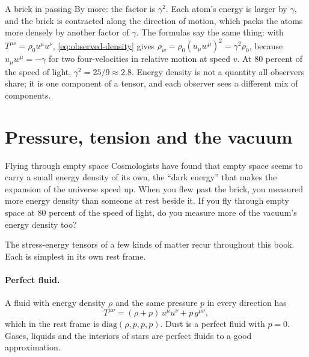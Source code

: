 \begin{revisited}{A brick in passing}
By more: the factor is $\gamma^{2}$. Each atom's energy is larger by $\gamma$,
and the brick is contracted along the direction of motion, which packs the
atoms more densely by another factor of $\gamma$. The formulas say the same
thing: with $T^{\mu\nu} = \rho_{0}u^{\mu}u^{\nu}$, \cref{eq:observed-density}
gives $\rho_{w} = \rho_{0}(u_{\mu}w^{\mu})^{2} = \gamma^{2}\rho_{0}$, because
$u_{\mu}w^{\mu} = -\gamma$ for two four-velocities in relative motion at speed
$v$. At 80 percent of the speed of light, $\gamma^{2} = 25/9 \approx 2.8$.
Energy density is not a quantity all observers share; it is one component of a
tensor, and each observer sees a different mix of components.
\end{revisited}

\section{Pressure, tension and the vacuum}\label{sec:catalogue}

\begin{thought}{Flying through empty space}
Cosmologists have found that empty space seems to carry a small energy density
of its own, the \enquote{dark energy} that makes the expansion of the universe
speed up. When you flew past the brick, you measured more energy density than
someone at rest beside it. If you fly through empty space at 80 percent of the
speed of light, do you measure more of the vacuum's energy density too?
\end{thought}

The stress-energy tensors of a few kinds of matter recur throughout this book.
Each is simplest in its own rest frame.

\paragraph{Perfect fluid.} A fluid with energy density $\rho$ and the same
pressure $p$ in every direction has
\begin{equation}
  T^{\mu\nu} = (\rho + p)\,u^{\mu}u^{\nu} + p\,g^{\mu\nu},
  \label{eq:perfect-fluid}
\end{equation}
which in the rest frame is $\mathrm{diag}(\rho, p, p, p)$. Dust is a perfect fluid
with $p = 0$. Gases, liquids and the interiors of stars are perfect fluids to
a good approximation.

